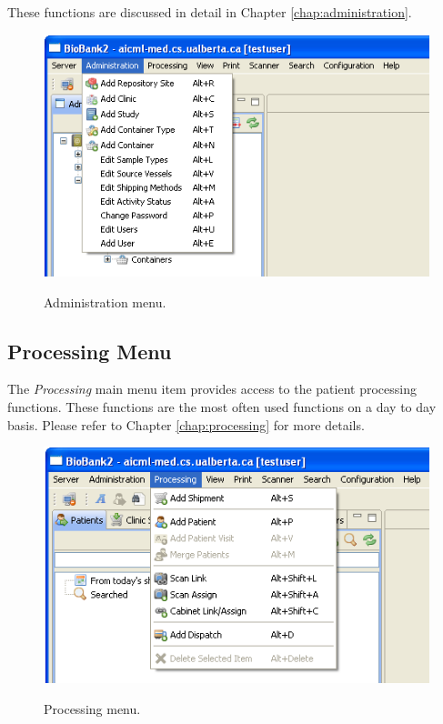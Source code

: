These functions are discussed in detail in Chapter \ref{chap:administration}.
\begin{figure}[H]
  \begin{center}
  \scalebox{0.5}
	   { \includegraphics*{screenshots/overview/main_menu_administration} }
	   \caption{Administration menu.}
	   \label{fig:main_menu_administration}
  \end{center}
\end{figure}

\subsection{Processing Menu}
The \emph{Processing} main menu item provides access to the patient processing
functions. These functions are the most often used functions on a day to day
basis. Please refer to Chapter \ref{chap:processing} for more details.
\begin{figure}[H]
  \centering
  \scalebox{0.5}
	   { \includegraphics*{screenshots/overview/main_menu_processing} }
	   \caption{Processing menu.}
	   \label{fig:main_menu_processing}
\end{figure}


